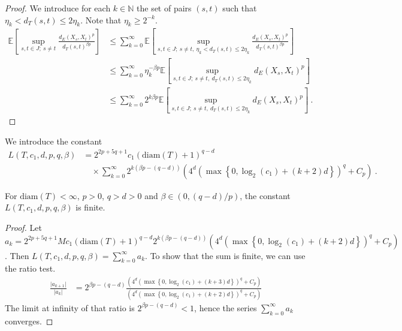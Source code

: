 \begin{proof}\leanok
We introduce for each $k \in \mathbb{N}$ the set of pairs $(s, t)$ such that $\eta_k < d_T(s, t) \le 2 \eta_k$.
Note that $\eta_k \ge 2^{-k}$.
\begin{align*}
  \mathbb{E}\left[ \sup_{s, t \in J;\: s \ne t} \frac{d_E(X_s, X_t)^p}{d_T(s, t)^{\beta p}} \right]
  &\le \sum_{k=0}^\infty \mathbb{E}\left[ \sup_{s, t \in J;\: s \ne t, \: \eta_k < d_T(s, t) \le 2 \eta_k} \frac{d_E(X_s, X_t)^p}{d_T(s, t)^{\beta p}} \right]
  \\
  &\le \sum_{k=0}^\infty \eta_k^{-\beta p} \mathbb{E}\left[ \sup_{s, t \in J;\: s \ne t, \: d_T(s, t) \le 2 \eta_k} d_E(X_s, X_t)^p \right]
  \\
  &\le \sum_{k=0}^\infty 2^{k \beta p} \mathbb{E}\left[ \sup_{s, t \in J;\: s \ne t, \: d_T(s, t) \le 2 \eta_k} d_E(X_s, X_t)^p \right]
  \: .
\end{align*}
\end{proof}


\begin{definition}\label{def:L}
  \leanok
We introduce the constant
\begin{align*}
  L(T, c_1, d, p, q, \beta)
  &= 2^{2p+5q+1} c_1 (\mathrm{diam}(T)+1)^{q-d}
  \\&\quad \times \sum_{k=0}^\infty 2^{k (\beta p - (q-d))}\left(4^d \left(\max\left\{0, \log_2(c_1) + (k + 2)d \right\}\right)^q
    + C_p\right)
  \: .
\end{align*}
\end{definition}


\begin{lemma}\label{lem:L_lt_top}
  \leanok
For $\mathrm{diam}(T) < \infty$, $p> 0$, $q > d > 0$ and $\beta \in (0, (q-d)/p)$, the constant $L(T, c_1, d, p, q, \beta)$ is finite.
\end{lemma}

\begin{proof}
\leanok
Let $a_k = 2^{2p+5q+1} M c_1 (\mathrm{diam}(T)+1)^{q-d} 2^{k (\beta p - (q-d))} \left(4^d \left(\max\left\{0, \log_2(c_1) + (k + 2)d \right\}\right)^q
    + C_p\right)$.
Then $L(T, c_1, d, p, q, \beta) = \sum_{k=0}^\infty a_k$.
To show that the sum is finite, we can use the ratio test.
\begin{align*}
  \frac{\vert a_{k+1} \vert}{\vert a_k \vert}
  &= 2^{\beta p - (q - d)}
    \frac{\left(4^d \left(\max\left\{0, \log_2(c_1) + (k + 3)d \right\}\right)^q + C_p\right)}
    {\left(4^d \left(\max\left\{0, \log_2(c_1) + (k + 2)d \right\}\right)^q + C_p\right)}
\end{align*}
The limit at infinity of that ratio is $2^{\beta p - (q - d)} < 1$, hence the series $\sum_{k=0}^\infty a_k$ converges.
\end{proof}


